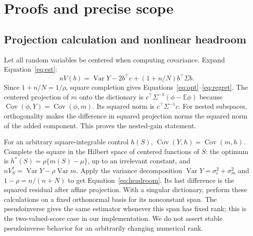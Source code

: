 \documentclass{article}
\newcommand{\E}{\mathbb E}
\newcommand{\Var}{\operatorname{Var}}
\newcommand{\Cov}{\operatorname{Cov}}
\begin{document}
\clearpage



\clearpage
\appendix
\section{Proofs and precise scope}
\label{app:proofs}
\subsection{Projection calculation and nonlinear headroom}
Let all random variables be centered when computing covariance. Expand Equation~\eqref{eq:est}:
\begin{equation}
 n V(b)=\Var Y-2b^\top c+(1+n/N)b^\top\Sigma b.
 \label{eq:expand}
\end{equation}
Since $1+n/N=1/\rho$, square completion gives Equations~\eqref{eq:opt}--\eqref{eq:regret}. The centered projection of $m$ onto the dictionary is $c^\top\Sigma^{-1}(\phi-\E\phi)$ because $\Cov(\phi,Y)=\Cov(\phi,m)$. Its squared norm is $c^\top\Sigma^{-1}c$. For nested subspaces, orthogonality makes the difference in squared projection norms the squared norm of the added component. This proves the nested-gain statement.

For an arbitrary square-integrable control $h(S)$, $\Cov(Y,h)=\Cov(m,h)$. Complete the square in the Hilbert space of centered functions of $S$: the optimum is $h^*(S)=\rho\{m(S)-\mu\}$, up to an irrelevant constant, and $n V_S^*=\Var Y-\rho\Var m$. Apply the variance decomposition $\Var Y=\sigma_\epsilon^2+\sigma_m^2$ and $1-\rho=n/(n+N)$ to get Equation~\eqref{eq:headroom}. Its last difference is the squared residual after affine projection. With a singular dictionary, perform these calculations on a fixed orthonormal basis for its nonconstant span. The pseudoinverse gives the same estimator whenever this span has fixed rank; this is the two-valued-score case in our implementation. We do not assert stable pseudoinverse behavior for an arbitrarily changing numerical rank.
\end{document}
